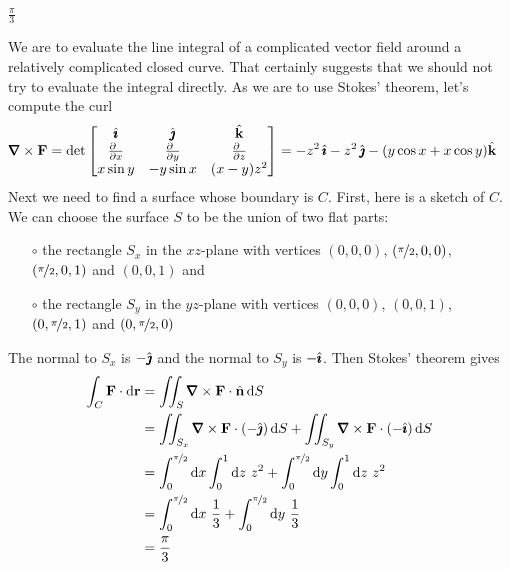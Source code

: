 
\begin{answer} 
$\frac{\pi}{3}$
\end{answer}


\begin{solution}
We are to evaluate the line integral of a complicated vector field
around a relatively complicated closed curve. That certainly suggests that
we should not try to evaluate the integral directly. As we are to use
Stokes' theorem, let's compute the curl
\begin{align*}
\vnabla\times\vF
&=\det\left[\begin{matrix}
\hi &\hj &\hk \\
\tfrac{\partial\hfill}{\partial x} & \tfrac{\partial\hfill}{\partial y} & 
                \tfrac{\partial\hfill}{\partial z} \\
x \sin y & - y \sin x & (x - y)z^2
\end{matrix}
\right]
=-z^2\,\hi-z^2\,\hj -(y\cos x +x\cos y)\hk
\end{align*}
Next we need to find a surface whose boundary is $C$.
First, here is a sketch of $C$.
We can choose the surface $S$ to be the union of two flat parts:
\begin{itemize}\itemsep1pt \parskip0pt  %
\item[$\circ$]
the rectangle $S_x$ in the $xz$-plane with vertices $(0,0,0)$,
$(\nicefrac{\pi}{2},0,0)$, $(\nicefrac{\pi}{2},0,1)$ and $(0,0,1)$ and
\item[$\circ$]
the rectangle $S_y$ in the $yz$-plane with vertices $(0,0,0)$,
$(0,0,1)$, $(0,\nicefrac{\pi}{2},1)$ and $(0,\nicefrac{\pi}{2},0)$
\end{itemize} 
The normal to $S_x$ is $-\hat{\pmb{\jmath}}$ and the normal to $S_y$ is $-\hat{\pmb{\imath}}$. Then Stokes'
theorem gives
\begin{align*}
\int_C\vF\cdot\dee{\vr}
&=\dblInt_S  \vnabla\times\vF\cdot\hn\,\dee{S} \\
&=\dblInt_{S_x}  \vnabla\times\vF\cdot(-\hj)\,\dee{S} 
  + \dblInt_{S_y}  \vnabla\times\vF\cdot(-\hi)\,\dee{S} \\
&=\int_0^{\nicefrac{\pi}{2}} \dee{x}\int_0^1\dee{z}\ z^2  
  + \int_0^{\nicefrac{\pi}{2}} \dee{y}\int_0^1\dee{z}\ z^2  \\
&=\int_0^{\nicefrac{\pi}{2}} \dee{x}\ \frac{1}{3}  
  + \int_0^{\nicefrac{\pi}{2}} \dee{y}\ \frac{1}{3}  \\
&=\frac{\pi}{3}
\end{align*}

\end{solution}

